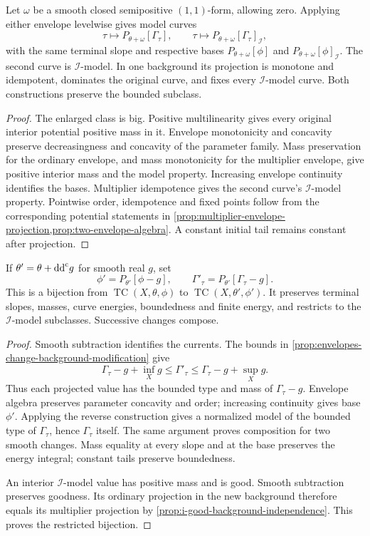 \begin{proposition}\label{prop:test-curve-background-and-ideal-projections}
Let $\omega$ be a smooth closed semipositive $(1,1)$-form, allowing zero. Applying either envelope levelwise gives model curves
\[
 \tau\longmapsto P_{\theta+\omega}[\Gamma_\tau],\qquad
 \tau\longmapsto P_{\theta+\omega}[\Gamma_\tau]_{\mathcal I},
\]
with the same terminal slope and respective bases
$P_{\theta+\omega}[\phi]$ and $P_{\theta+\omega}[\phi]_{\mathcal I}$.
The second curve is $\mathcal I$-model. In one background its projection is monotone and idempotent, dominates the original curve, and fixes every $\mathcal I$-model curve. Both constructions preserve the bounded subclass.
\end{proposition}
\begin{proof}
The enlarged class is big. Positive multilinearity gives every original interior potential positive mass in it. Envelope monotonicity and concavity preserve decreasingness and concavity of the parameter family. Mass preservation for the ordinary envelope, and mass monotonicity for the multiplier envelope, give positive interior mass and the model property. Increasing envelope continuity identifies the bases. Multiplier idempotence gives the second curve's $\mathcal I$-model property. Pointwise order, idempotence and fixed points follow from the corresponding potential statements in \cref{prop:multiplier-envelope-projection,prop:two-envelope-algebra}. A constant initial tail remains constant after projection.
\end{proof}

\begin{proposition}\label{prop:test-curve-smooth-background-change}
If $\theta'=\theta+\mathrm{dd}^{\mathrm{c}} g$ for smooth real $g$, set
\[
 \phi'=P_{\theta'}[\phi-g],\qquad
                 \Gamma'_\tau=P_{\theta'}[\Gamma_\tau-g].
\]
This is a bijection from $\operatorname{TC}(X,\theta,\phi)$ to $\operatorname{TC}(X,\theta',\phi')$. It preserves terminal slopes, masses, curve energies, boundedness and finite energy, and restricts to the $\mathcal I$-model subclasses. Successive changes compose.
\end{proposition}
\begin{proof}
Smooth subtraction identifies the currents. The bounds in \cref{prop:envelopes-change-background-modification} give
\[
 \Gamma_\tau-g+\inf_Xg\leq\Gamma'_\tau
                              \leq\Gamma_\tau-g+\sup_Xg.
\]
Thus each projected value has the bounded type and mass of $\Gamma_\tau-g$. Envelope algebra preserves parameter concavity and order; increasing continuity gives base $\phi'$. Applying the reverse construction gives a normalized model of the bounded type of $\Gamma_\tau$, hence $\Gamma_\tau$ itself. The same argument proves composition for two smooth changes. Mass equality at every slope and at the base preserves the energy integral; constant tails preserve boundedness.

An interior $\mathcal I$-model value has positive mass and is good. Smooth subtraction preserves goodness. Its ordinary projection in the new background therefore equals its multiplier projection by \cref{prop:i-good-background-independence}. This proves the restricted bijection.
\end{proof}

